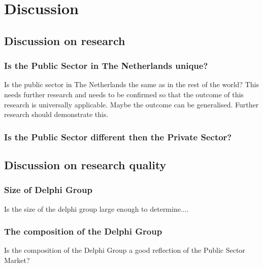 \chapter{Discussion}
\label{ch:discussion}


\section{Discussion on research}
\label{sec:discussiononresearch}


\subsection{Is the Public Sector in The Netherlands unique?}
\label{sub:discussionpublicsector}
Is the public sector in The Netherlands the same as in the rest of the world? This needs further research and needs to be confirmed so that the outcome of this research is universally applicable. Maybe the outcome can be generalised. Further research should demonstrate this.

\subsection{Is the Public Sector different then the Private Sector?}
\label{sub:discussionpublicvsprivate}
\lipsum[1]


\section{Discussion on research quality}
\label{sec:discusssionresearchquality}
\subsection{Size of Delphi Group}
\label{sub:discussionsizeofdelphi}
Is the size of the delphi group large enough to determine....
\subsection{The composition of the Delphi Group}
\label{sub:compositionofdelphi}
Is the composition of the Delphi Group a good reflection of the Public Sector Market?